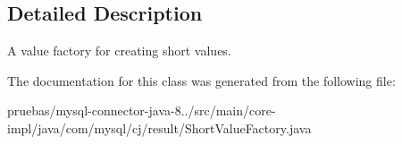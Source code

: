 \subsection{Detailed Description}
A value factory for creating short values. 

The documentation for this class was generated from the following file\+:\begin{DoxyCompactItemize}
\item 
pruebas/mysql-\/connector-\/java-\/8../src/main/core-\/impl/java/com/mysql/cj/result/Short\+Value\+Factory.\+java\end{DoxyCompactItemize}
